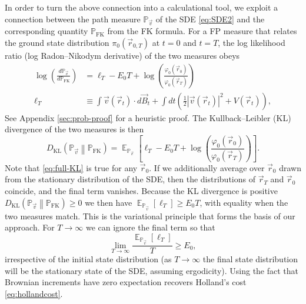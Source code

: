 \documentclass[12pt]{msml2020} %
\DeclareMathOperator*{\E}{\mathbb{E}}
\newcommand*{\bv}{\vec{v}}
\newcommand*{\br}{\vec{r}}
\begin{document}
In order to turn the above connection into a calculational tool, we exploit a connection between the path measure $\mathbb{P}_{\bv}$ of the SDE \eqref{eq:SDE2} and the corresponding quantity $\mathbb{P}_\text{FK}$ from the FK formula. For a FP measure that relates the ground state distribution $\pi_0(\br_{0,T})$ at $t=0$ and $t=T$, the log likelihood ratio (log Radon--Nikodym derivative) of the two measures obeys
%
\begin{align}\label{eq:KLlim}
  \log\left(\frac{d\mathbb{P}_{\bv}}{d\mathbb{P}_\text{FK}}\right) &=\ell_T - E_0 T+\log\left(\frac{\varphi_0(\vec{r}_0)}{\varphi_0(\vec{r}_T)}\right)\nonumber\\
   \ell_T&\equiv \int \bv(\br_t)
  \cdot d\vec{B}_t+\int dt\left(\frac{1}{2}|\bv(\br_t)|^2+V(\br_t)\right),
\end{align}
%
See Appendix \ref{sec:prob-proof} for a heuristic proof. The  Kullback–Leibler (KL) divergence of the two measures is then
%
\begin{equation}\label{eq:full-KL}
    D_{\text{KL}}\left(\mathbb{P}_{\bv} \middle\| \mathbb{P}_\text{FK}\right)=\E_{\mathbb{P}_{\bv}}\left[\ell_T-E_0 T+\log\left(\frac{\varphi_0(\vec{r}_0)}{\varphi_0(\vec{r}_T)}\right)\right].
\end{equation}
%
Note that \eqref{eq:full-KL} is true for any $\vec{r}_0$. If we additionally average over $\vec{r}_0$ drawn from the stationary distribution of the SDE, then the distributions of $\vec{r}_T$ and $\vec{r}_0$ coincide, and the final term vanishes. Because the KL divergence is positive $D_{\text{KL}}\left(\mathbb{P}_{\bv} \middle\| \mathbb{P}_\text{FK}\right)\geq 0$ we then have $\E_{\mathbb{P}_{\bv}}\left[\ell_T\right]\geq E_0 T$, with equality when the two measures match. This is the variational principle that forms the basis of our approach. For $T\to\infty$ we can ignore the final term so that
%
\begin{equation}
    \lim_{T\to\infty} \frac{\E_{\mathbb{P}_{\bv}}\left[\ell_T\right]}{T}\geq E_0,
\end{equation}
%
irrespective of the initial state distribution (as $T\to\infty$ the final state distribution will be the stationary state of the SDE, assuming ergodicity). Using the fact that Brownian increments have zero expectation recovers Holland's cost \eqref{eq:hollandcost}.



\end{document}
